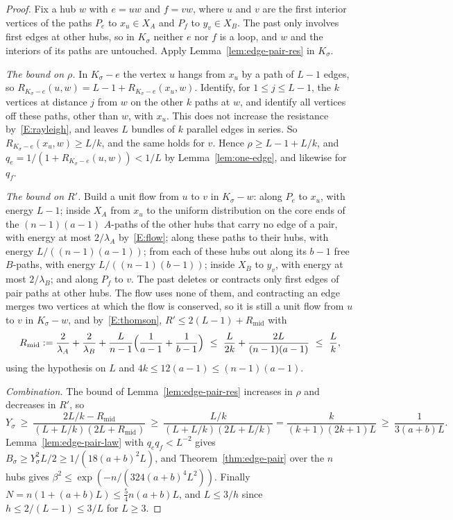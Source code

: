 \begin{proof}
Fix a hub $w$ with $e=uw$ and $f=vw$, where $u$ and $v$ are the first interior vertices of the paths $P_e$ to $x_u\in X_A$ and $P_f$ to $y_v\in X_B$. The past only involves first edges at other hubs, so in $K_\sigma$ neither $e$ nor $f$ is a loop, and $w$ and the interiors of its paths are untouched. Apply Lemma~\ref{lem:edge-pair-res} in $K_\sigma$.

\emph{The bound on $\rho$.} In $K_\sigma-e$ the vertex $u$ hangs from $x_u$ by a path of $L-1$ edges, so $R_{K_\sigma-e}(u,w)=L-1+R_{K_\sigma-e}(x_u,w)$. Identify, for $1\le j\le L-1$, the $k$ vertices at distance $j$ from $w$ on the other $k$ paths at $w$, and identify all vertices off these paths, other than $w$, with $x_u$. This does not increase the resistance by~\ref{E:rayleigh}, and leaves $L$ bundles of $k$ parallel edges in series. So $R_{K_\sigma-e}(x_u,w)\ge L/k$, and the same holds for $v$. Hence $\rho\ge L-1+L/k$, and $q_e=1/(1+R_{K_\sigma-e}(u,w))<1/L$ by Lemma~\ref{lem:one-edge}, and likewise for $q_f$.

\emph{The bound on $R'$.} Build a unit flow from $u$ to $v$ in $K_\sigma-w$: along $P_e$ to $x_u$, with energy $L-1$; inside $X_A$ from $x_u$ to the uniform distribution on the core ends of the $(n-1)(a-1)$ $A$-paths of the other hubs that carry no edge of a pair, with energy at most $2/\lambda_A$ by~\ref{E:flow}; along these paths to their hubs, with energy $L/((n-1)(a-1))$; from each of these hubs out along its $b-1$ free $B$-paths, with energy $L/((n-1)(b-1))$; inside $X_B$ to $y_v$, with energy at most $2/\lambda_B$; and along $P_f$ to $v$. The past deletes or contracts only first edges of pair paths at other hubs. The flow uses none of them, and contracting an edge merges two vertices at which the flow is conserved, so it is still a unit flow from $u$ to $v$ in $K_\sigma-w$, and by~\ref{E:thomson}, $R'\le2(L-1)+R_{\mathrm{mid}}$ with
\[
  R_{\mathrm{mid}}:=\frac2{\lambda_A}+\frac2{\lambda_B}+\frac L{n-1}\Bigl(\frac1{a-1}+\frac1{b-1}\Bigr)\ \le\ \frac L{2k}+\frac{2L}{(n-1)(a-1)}\ \le\ \frac Lk,
\]
using the hypothesis on $L$ and $4k\le12(a-1)\le(n-1)(a-1)$.

\emph{Combination.} The bound of Lemma~\ref{lem:edge-pair-res} increases in $\rho$ and decreases in $R'$, so
\[
  Y_\sigma\ \ge\ \frac{2L/k-R_{\mathrm{mid}}}{(L+L/k)(2L+R_{\mathrm{mid}})}\ \ge\ \frac{L/k}{(L+L/k)(2L+L/k)}=\frac k{(k+1)(2k+1)L}\ \ge\ \frac1{3(a+b)L}.
\]
Lemma~\ref{lem:edge-pair-law} with $q_eq_f<L^{-2}$ gives $B_\sigma\ge Y_\sigma^2L/2\ge1/(18(a+b)^2L)$, and Theorem~\ref{thm:edge-pair} over the $n$ hubs gives $\beta^2\le\exp(-n/(324(a+b)^4L^2))$. Finally $N=n(1+(a+b)L)\le\frac54n(a+b)L$, and $L\le3/h$ since $h\le2/(L-1)\le3/L$ for $L\ge3$.
\end{proof}


